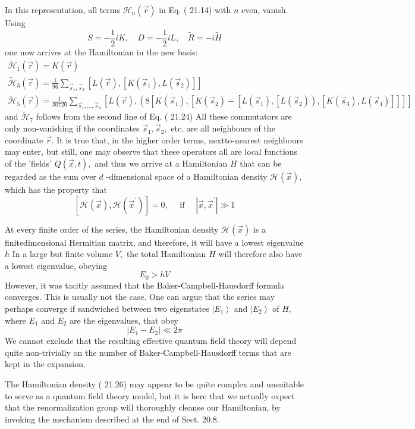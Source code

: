 \documentclass[main.tex]{subfiles}
\begin{document}
In this representation, all terms $\mathcal{H}_{n}(\vec{r})$ in Eq. ( 21.14) with $n$ even, vanish. Using
$$
S=-\frac{1}{2} i K, \quad D=-\frac{1}{2} i L, \quad \tilde{R}=-i \tilde{H}
$$
one now arrives at the Hamiltonian in the new basis:
$$
\begin{array}{l}
{\tilde{\mathcal{H}}_{1}(\vec{r})=K(\vec{r})} \\
{\tilde{\mathcal{H}}_{3}(\vec{r})=\frac{1}{96} \sum_{\vec{s}_{1}, \vec{s}_{2}}\left[L(\vec{r}),\left[K\left(\vec{s}_{1}\right), L\left(\vec{s}_{2}\right)\right]\right]} \\
{\tilde{\mathcal{H}}_{5}(\vec{r})=\frac{1}{30720} \sum_{\vec{s}_{1}, \ldots, \vec{s}_{4}}\left[L(\vec{r}),\left(8\left[K\left(\vec{s}_{1}\right),\left[K\left(\vec{s}_{2}\right)-\left[L\left(\vec{s}_{1}\right),\left[L\left(\vec{s}_{2}\right)\right),\left[K\left(\vec{s}_{3}\right), L\left(\vec{s}_{4}\right)\right]\right]\right]\right]\right.\right.}
\end{array}
$$
and $\tilde{\mathcal{H}}_{7}$ follows from the second line of Eq. ( 21.24) All these commutators are only non-vanishing if the coordinates $\vec{s}_{1}, \vec{s}_{2},$ etc. are all neighbours of the coordinate $\vec{r} .$ It is true that, in the higher order terms, nextto-nearest neighbours may enter, but still, one may observe that these operators all are local functions of the 'fields' $Q(\vec{x}, t),$ and thus we arrive at a Hamiltonian $H$ that can be regarded as the sum over $d$ -dimensional space of a Hamiltonian density $\mathcal{H}(\vec{x}),$ which has the property that
$$
\left[\mathcal{H}(\vec{x}), \mathcal{H}\left(\vec{x}^{\prime}\right)\right]=0, \quad \text { if } \quad\left|\vec{x}, \vec{x}^{\prime}\right| \gg 1
$$

At every finite order of the series, the Hamiltonian density $\mathcal{H}(\vec{x})$ is a finitedimensional Hermitian matrix, and therefore, it will have a lowest eigenvalue $h$ In a large but finite volume $V,$ the total Hamiltonian $H$ will therefore also have a lowest eigenvalue, obeying
$$
E_{0}>h V
$$
However, it was tacitly assumed that the Baker-Campbell-Hausdorff formula converges. This is usually not the case. One can argue that the series may perhaps converge if sandwiched between two eigenstates $\left|E_{1}\right\rangle$ and $\left|E_{2}\right\rangle$ of $H,$ where $E_{1}$ and
$E_{2}$ are the eigenvalues, that obey
$$
\left|E_{1}-E_{2}\right| \ll 2 \pi
$$
We cannot exclude that the resulting effective quantum field theory will depend quite non-trivially on the number of Baker-Campbell-Hausdorff terms that are kept in the expansion.

The Hamiltonian density ( 21.26) may appear to be quite complex and unsuitable to serve as a quantum field theory model, but it is here that we actually expect that the renormalization group will thoroughly cleanse our Hamiltonian, by invoking the mechanism described at the end of Sect. $20.8 .$





\begin{equation}\label{21.}
	
\end{equation}
\end{document}
